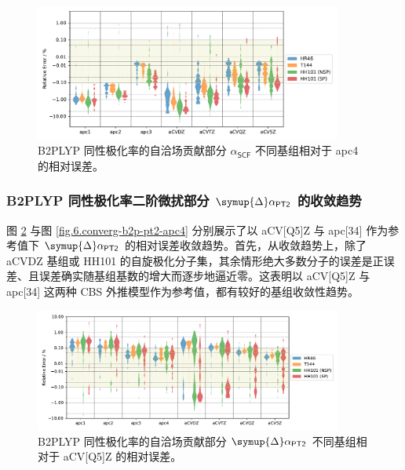 \begin{figure}[!t]
    \centering
    \includegraphics[width=0.9\textwidth]{assets/converg-b2p-scf-apc4.pdf}
    \caption[B2PLYP $\alpha_\textsf{SCF}$ 不同基组相对于 apc4 的相对误差]{B2PLYP 同性极化率的自洽场贡献部分 $\alpha_\textsf{SCF}$ 不同基组相对于 apc4 的相对误差。}
    \label{fig.6.converg-b2p-scf-apc4}
\end{figure}

\subsubsection{B2PLYP 同性极化率二阶微扰部分 $\symup{\Delta} \alpha_\textsf{PT2}$ 的收敛趋势}

图 \ref{fig.6.converg-b2p-pt2-aCV5Z} 与图 \ref{fig.6.converg-b2p-pt2-apc4} 分别展示了以 aCV[Q5]Z 与 apc[34] 作为参考值下 $\symup{\Delta} \alpha_\textsf{PT2}$ 的相对误差收敛趋势。首先，从收敛趋势上，除了 aCVDZ 基组或 HH101 的自旋极化分子集，其余情形绝大多数分子的误差是正误差、且误差确实随基组基数的增大而逐步地逼近零。这表明以 aCV[Q5]Z 与 apc[34] 这两种 CBS 外推模型作为参考值，都有较好的基组收敛性趋势。

\begin{figure}[!t]
    \centering
    \includegraphics[width=0.9\textwidth]{assets/converg-b2p-pt2-aCV5Z.pdf}
    \caption[B2PLYP $\symup{\Delta} \alpha_\textsf{PT2}$ 不同基组相对于 aCV\text{[Q5]}Z 的相对误差]{B2PLYP 同性极化率的自洽场贡献部分 $\symup{\Delta} \alpha_\textsf{PT2}$ 不同基组相对于 aCV[Q5]Z 的相对误差。}
    \label{fig.6.converg-b2p-pt2-aCV5Z}
\end{figure}

